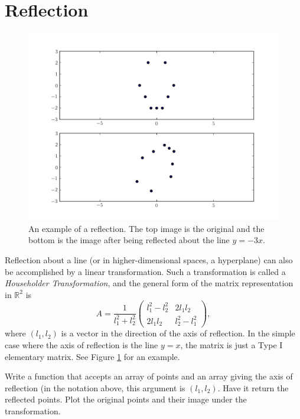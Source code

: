 \section*{Reflection}
\begin{figure}
\centering
\includegraphics[width=\textwidth]{reflection.pdf}
\caption{An example of a reflection.
The top image is the original and the bottom is the image after
being reflected about the line $y = -3x$.}
\label{basis:reflection}
\end{figure}
Reflection about a line (or in higher-dimensional spaces, a hyperplane) can also be
accomplished by a linear transformation. Such a transformation is called a
\emph{Householder Transformation}, and the general form of the matrix representation in
$\mathbb{R}^2$ is
\[
A = \frac{1}{l_1^2 + l_2^2}
\begin{pmatrix}
l_1^2 - l_2^2 & 2l_1l_2 \\
2l_1l_2 & l_2^2 - l_1^2
\end{pmatrix},
\]
where $(l_1, l_2)$ is a vector in the direction of the axis of reflection. In the simple
case where the axis of reflection is the line $y=x$, the matrix is just a Type I elementary
matrix. See Figure \ref{basis:reflection} for an example.

\begin{problem}
Write a function that accepts an array of points and an array giving the axis of
reflection (in the notation above, this argument is $(l_1, l_2)$.
Have it return the reflected points.
Plot the original points and their image under the transformation.
\end{problem}

